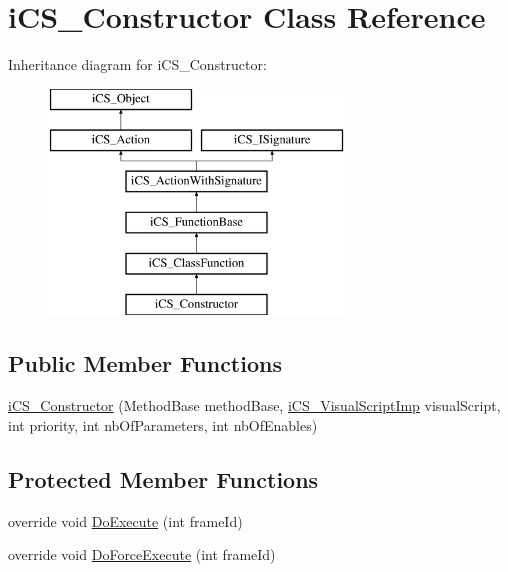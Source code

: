 \hypertarget{classi_c_s___constructor}{\section{i\+C\+S\+\_\+\+Constructor Class Reference}
\label{classi_c_s___constructor}
}
Inheritance diagram for i\+C\+S\+\_\+\+Constructor\+:\begin{figure}[H]
\begin{center}
\leavevmode
\includegraphics[height=6.000000cm]{classi_c_s___constructor}
\end{center}
\end{figure}
\subsection*{Public Member Functions}
\begin{DoxyCompactItemize}
\item 
\hyperlink{classi_c_s___constructor_a2f19da3c110f02691c2f2020142449e3}{i\+C\+S\+\_\+\+Constructor} (Method\+Base method\+Base, \hyperlink{classi_c_s___visual_script_imp}{i\+C\+S\+\_\+\+Visual\+Script\+Imp} visual\+Script, int priority, int nb\+Of\+Parameters, int nb\+Of\+Enables)
\end{DoxyCompactItemize}
\subsection*{Protected Member Functions}
\begin{DoxyCompactItemize}
\item 
override void \hyperlink{classi_c_s___constructor_aa430d30154493c3f8467063f855bc519}{Do\+Execute} (int frame\+Id)
\item 
override void \hyperlink{classi_c_s___constructor_aa982a0b1a6338a2f317256100a8e0d8a}{Do\+Force\+Execute} (int frame\+Id)
\end{DoxyCompactItemize}
